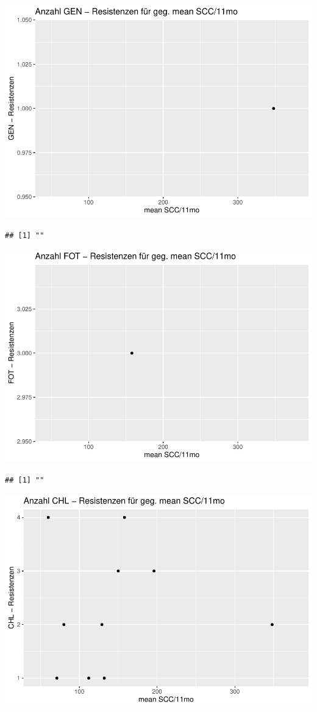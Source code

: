 \documentclass[
]{article}
\begin{document}
\includegraphics{NResistenzen_files/figure-latex/unnamed-chunk-6-14.pdf}

\begin{verbatim}
## [1] ""
\end{verbatim}

\includegraphics{NResistenzen_files/figure-latex/unnamed-chunk-6-15.pdf}

\begin{verbatim}
## [1] ""
\end{verbatim}

\includegraphics{NResistenzen_files/figure-latex/unnamed-chunk-6-16.pdf}
\end{document}
